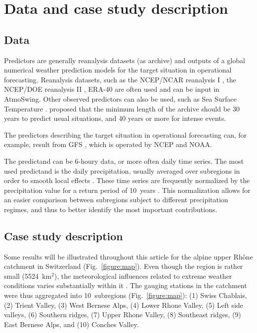 \documentclass[review]{elsarticle}
\begin{document}
\section{Data and case study description}
\label{sec:data_and_case_study}

\subsection{Data}
\label{sec:data}

Predictors are generally reanalysis datasets (as archive) and outputs of a global numerical weather prediction models for the target situation in operational forecasting. Reanalysis datasets, such as the NCEP/NCAR reanalysis I \citep[6-hourly, 17 pressure levels at a resolution of 2.5\degree, see][]{Kalnay1996}, the NCEP/DOE reanalysis II \citep{Kanamitsu2002}, ERA-40 \citep{Uppala2005} are often used and can be input in AtmoSwing. Other observed predictors can also be used, such as Sea Surface Temperature \citep[SST, ][]{Reynolds2007}. \citet{Bontron2004} proposed that the minimum length of the archive should be 30 years to predict usual situations, and 40 years or more for intense events.

The predictors describing the target situation in operational forecasting can, for example, result from GFS \citep[Global Forecast System,][]{Kanamitsu1991,Kanamitsu1989}, which is operated by NCEP and NOAA.

The predictand can be 6-houry data, or more often daily time series. The most used predictand is the daily precipitation, usually averaged over subregions in order to smooth local effects \citep{Obled2002, Marty2012}. These time series are frequently normalized by the precipitation value for a return period of 10~years \citep{Djerboua2001}. This normalization allows for an easier comparison between subregions subject to different precipitation regimes, and thus to better identify the most important contributions.

\subsection{Case study description}
\label{sec:case_study}

Some results will be illustrated throughout this article for the alpine upper Rh\^{o}ne catchment in Switzerland (Fig.\ \ref{figure:map}). Even though the region is rather small (5524~km$^{2}$), the meteorological influences related to extreme weather conditions varies substantially within it \citep[see][]{Horton2012}. The gauging stations in the catchment were thus aggregated into 10~subregions (Fig.\ \ref{figure:map}): (1) Swiss Chablais, (2) Trient Valley, (3) West Bernese Alps, (4) Lower Rhone Valley, (5) Left side valleys, (6) Southern ridges, (7) Upper Rhone Valley, (8) Southeast ridges, (9) East Bernese Alps, and (10) Conches Valley.
\end{document}
